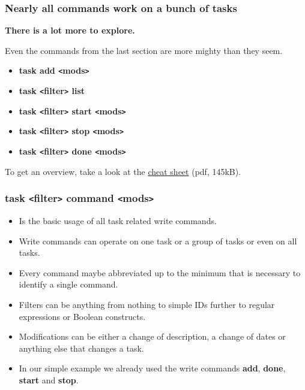 \documentclass[t,handout]{beamer}
\begin{document}
\begin{frame}\frametitle{Nearly all commands work on a bunch of tasks}
\textbf{There is a lot more to explore.}

Even the commands from the last section are more mighty than they seem. \pause

\begin{itemize}
\item \textbf{task add {\tt<}mods{\tt>}}
\item \textbf{task {\tt<}filter{\tt>} list}
\item \textbf{task {\tt<}filter{\tt>} start {\tt<}mods{\tt>}}
\item \textbf{task {\tt<}filter{\tt>} stop {\tt<}mods{\tt>}}
\item \textbf{task {\tt<}filter{\tt>} done {\tt<}mods{\tt>}}
\end{itemize} \pause

To get an overview, take a look at the \href{http://taskwarrior.org/download/task-2.3.0.ref.pdf}{cheat sheet} (pdf, 145kB).
\end{frame}

\begin{frame}\frametitle{task {\tt<}filter{\tt>} command {\tt<}mods{\tt>}}
\begin{itemize} 
\item Is the basic usage of all task related write commands.
\item Write commands can operate on one task or a group of tasks or even on all tasks.
\item Every command maybe abbreviated up to the minimum that is necessary to identify a single command.
\item Filters can be anything from nothing to simple IDs further to regular expressions or Boolean constructs.
\item Modifications can be either a change of description, a change of dates or anything else that changes a task.
\item In our simple example we already used the write commands \textbf{add}, \textbf{done}, \textbf{start} and \textbf{stop}.
\end{itemize}
\end{frame}
\end{document}
